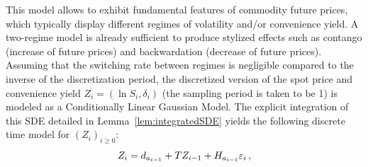 This model allows to exhibit fundamental features of commodity future prices, which typically display different regimes of volatility and/or convenience yield. A two-regime model is already sufficient to produce stylized effects such as contango (increase of future prices) and backwardation (decrease of future prices).  Assuming that the switching rate between regimes is negligible compared to the inverse of the discretization period, the discretized version of the spot price and convenience yield $Z_i= (\ln S_i, \delta_i)$ (the sampling period is taken to be 1) is modeled as a Conditionally Linear Gaussian Model. The explicit integration of this SDE detailed in Lemma~\ref{lem:integratedSDE} yields the following discrete time model for $(Z_i)_{i\ge 0}$:
\[
Z_i = d_{a_{i-1}} + T Z_{i-1} + H_{a_{i-1}} \varepsilon_i\,,
\]
